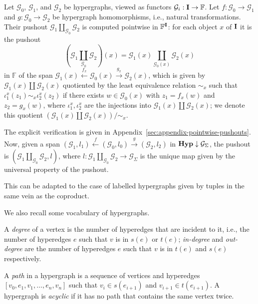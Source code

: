 \begin{definition}[Pushout]\label{def:pushout_hyp}
Let $\mathcal{G}_0$, $\mathcal{G}_1$, and $\mathcal{G}_2$ be hypergraphs, viewed as functors $\mathcal{G}_i : \mathbf{I} \to \mathbb{F}$.
Let $f : \mathcal{G}_0 \to \mathcal{G}_1$ and $g : \mathcal{G}_0 \to \mathcal{G}_2$ be hypergraph homomorphisms, i.e., natural transformations.
Their pushout $\mathcal{G}_1 \coprod_{\mathcal{G}_0} \mathcal{G}_2$ is computed pointwise in $\mathbb{F}^{\mathbf{I}}$: for each object $x$ of $\mathbf{I}$ it is the pushout
\[
(\mathcal{G}_1 \coprod_{\mathcal{G}_0} \mathcal{G}_2)(x) = \mathcal{G}_1(x) \coprod_{\mathcal{G}_0(x)} \mathcal{G}_2(x)
\]
in $\mathbb{F}$ of the span $\mathcal{G}_1(x) \xleftarrow{f_x} \mathcal{G}_0(x) \xrightarrow{g_x} \mathcal{G}_2(x)$, which is given by $\mathcal{G}_1(x) \coprod \mathcal{G}_2(x)$ quotiented by the least equivalence relation $\sim_x$ such that $\iota^x_1(z_1) \sim_x \iota^x_2(z_2)$ if there exists $w \in \mathcal{G}_0(x)$ with $z_1 = f_x(w)$ and $z_2 = g_x(w)$, where $\iota^x_1, \iota^x_2$ are the injections into $\mathcal{G}_1(x) \coprod \mathcal{G}_2(x)$; we denote this quotient $(\mathcal{G}_1(x) \coprod \mathcal{G}_2(x)) / {\sim_x}$.

The explicit verification is given in Appendix~\ref{sec:appendix-pointwise-pushouts}.
Now, given a span $(\mathcal{G}_1, l_1) \xleftarrow{f} (\mathcal{G}_0, l_0) \xrightarrow{g} (\mathcal{G}_2, l_2)$ in $\mathbf{Hyp} \downarrow \mathcal{G}_{\Sigma}$, the pushout is $(\mathcal{G}_1 \coprod_{\mathcal{G}_0} \mathcal{G}_2, l)$, where $l : \mathcal{G}_1 \coprod_{\mathcal{G}_0} \mathcal{G}_2 \to \mathcal{G}_{\Sigma}$ is the unique map given by the universal property of the pushout.

This can be adapted to the case of labelled hypergraphs given by tuples in the same vein as the coproduct.
\end{definition}
We also recall some vocabulary of hypergraphs.

\begin{definition}[Degree]
A \emph{degree} of a vertex is the number of hyperedges that are incident to it, i.e., the number of hyperedges $e$ such that $v$ is in $s(e)$ or $t(e)$;
\emph{in-degree} and \emph{out-degree} are the number of hyperedges $e$ such that $v$ is in $t(e)$ and $s(e)$ respectively.
\end{definition}

\begin{definition}[Path]
A \emph{path} in a hypergraph is a sequence of vertices and hyperedges $[v_0, e_1, v_1, \ldots, e_n, v_n]$ such that $v_i \in s(e_{i+1})$ and $v_{i+1} \in t(e_{i+1})$.
A hypergraph is \emph{acyclic} if it has no path that contains the same vertex twice.
\end{definition}

